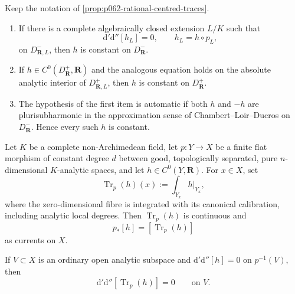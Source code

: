 \begin{proposition}\label{prop:p062-explicit-base-change}
Keep the notation of \cref{prop:p062-rational-centred-traces}.

\begin{enumerate}
\item If there is a complete algebraically closed extension \(L/K\) such
that
\[
             \mathrm d'\mathrm d''[h_L]=0,
             \qquad h_L=h\circ p_L,
\]
on \(D^-_{\mathbf R,L}\), then \(h\) is constant on
\(D^-_{\mathbf R}\).

\item If \(h\in C^0(D^+_{\mathbf R},\mathbf R)\) and the analogous
equation holds on the absolute analytic interior of
\(D^+_{\mathbf R,L}\), then \(h\) is constant on
\(D^+_{\mathbf R}\).

\item The hypothesis of the first item is automatic if both \(h\) and
\(-h\) are plurisubharmonic in the approximation sense of
Chambert--Loir--Ducros on \(D^-_{\mathbf R}\).  Hence every such \(h\) is
constant.
\end{enumerate}
\end{proposition}


\begin{proposition}\label{prop:p062-finite-flat-continuous-trace}
Let \(K\) be a complete non-Archimedean field, let
\(p\colon Y\to X\) be a finite flat morphism of constant degree \(d\)
between good, topologically separated, pure \(n\)-dimensional
\(K\)-analytic spaces, and let \(h\in C^0(Y,\mathbf R)\).  For \(x\in X\),
set
\begin{equation}\label{eq:p062-finite-trace-definition}
 \operatorname{Tr}_p(h)(x)
   :=\int_{Y_x} h|_{Y_x},
\end{equation}
where the zero-dimensional fibre is integrated with its canonical
calibration, including analytic local degrees.  Then
\(\operatorname{Tr}_p(h)\) is continuous and
\begin{equation}\label{eq:p062-finite-trace-current}
                  p_*[h]=[\operatorname{Tr}_p(h)]
\end{equation}
as currents on \(X\).

If \(V\subset X\) is an ordinary open analytic subspace and
\(
 \mathrm d'\mathrm d''[h]=0
\)
on \(p^{-1}(V)\), then
\begin{equation}\label{eq:p062-finite-trace-hessian}
 \mathrm d'\mathrm d''[\operatorname{Tr}_p(h)]=0
 \qquad\text{on }V.
\end{equation}
\end{proposition}

